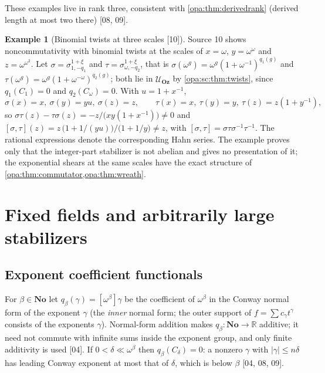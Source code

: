 \documentclass[11pt,oneside]{article}
\numberwithin{equation}{section}
\theoremstyle{definition}
\newtheorem{example}[example]{Example}
\theoremstyle{remark}
\newcommand{\No}{\mathbf{No}}
\newcommand{\Oz}{\mathbf{Oz}}
\newcommand{\R}{\mathbb R}
\newcommand{\UU}{\mathcal U}
\newcommand{\bb}{\mathbin{\ll}}
\newcommand{\src}[1]{\textup{\textsf{\small[#1]}}}
\begin{document}
These examples live in rank three, consistent with \cref{opa:thm:derivedrank}
(derived length at most two there) \src{08, 09}.

\begin{example}[Binomial twists at three scales \src{10}]\label{opa:sc:ex:threescales}
Source 10 shows noncommutativity with binomial twists at the scales of
$x=\omega$, $y=\omega^\omega$ and $z=\omega^{\omega^2}$. Let
$\sigma=\sigma^{1+\xi}_{1,-q_1}$ and $\tau=\sigma^{1+\xi}_{\omega,-q_2}$, that is
$\sigma(\omega^g)=\omega^g(1+\omega^{-1})^{q_1(g)}$ and
$\tau(\omega^g)=\omega^g(1+\omega^{-\omega})^{q_2(g)}$; both lie in $\UU_\Oz$ by
\cref{opa:sc:thm:twists}, since $q_1(C_1)=0$ and $q_2(C_\omega)=0$. With
$u=1+x^{-1}$,
\[
 \sigma(x)=x,\ \sigma(y)=yu,\ \sigma(z)=z,\qquad
 \tau(x)=x,\ \tau(y)=y,\ \tau(z)=z(1+y^{-1}),
\]
so $\sigma\tau(z)-\tau\sigma(z)=-z/\bigl(xy(1+x^{-1})\bigr)\ne0$ and
$[\sigma,\tau](z)=z\,\bigl(1+1/(yu)\bigr)/\bigl(1+1/y\bigr)\ne z$, with
$[\sigma,\tau]=\sigma\tau\sigma^{-1}\tau^{-1}$. The rational expressions denote the
corresponding Hahn series. The example proves only that the integer-part
stabilizer is not abelian and gives no presentation of it; the exponential
shears at the same scales have the exact structure of
\cref{opa:thm:commutator,opa:thm:wreath}.
\end{example}

\section{Fixed fields and arbitrarily large stabilizers}\label{opa:sec:fixed}

\subsection{Exponent coefficient functionals}

For $\beta\in\No$ let $q_\beta(\gamma)=[\omega^\beta]\gamma$ be the coefficient of
$\omega^\beta$ in the Conway normal form of the exponent $\gamma$ (the \emph{inner}
normal form; the outer support of $f=\sum c_\gamma t^\gamma$ consists of the
exponents $\gamma$). Normal-form addition makes $q_\beta:\No\to\R$ additive; it
need not commute with infinite sums inside the exponent group, and only finite
additivity is used \src{04}. If $0<\delta\bb\omega^\beta$ then $q_\beta(C_\delta)=0$:
a nonzero $\gamma$ with $|\gamma|\le n\delta$ has leading Conway exponent at most that
of $\delta$, which is below $\beta$ \src{04, 08, 09}.
\end{document}

